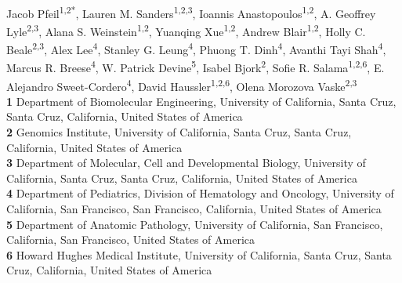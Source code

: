 \documentclass[10pt,letterpaper]{article}
\begin{document}
\vspace*{0.2in}

\begin{flushleft}
{\Large
\textbf{} %
}
\newline
\\
Jacob Pfeil\textsuperscript{1,2*},
Lauren M. Sanders\textsuperscript{1,2,3},
Ioannis Anastopoulos\textsuperscript{1,2},
A. Geoffrey Lyle\textsuperscript{2,3},
Alana S. Weinstein\textsuperscript{1,2},
Yuanqing Xue\textsuperscript{1,2},
Andrew Blair\textsuperscript{1,2},
Holly C. Beale\textsuperscript{2,3},
Alex Lee\textsuperscript{4},
Stanley G. Leung\textsuperscript{4},
Phuong T. Dinh\textsuperscript{4},
Avanthi Tayi Shah\textsuperscript{4},
Marcus R. Breese\textsuperscript{4},
W. Patrick Devine\textsuperscript{5},
Isabel Bjork\textsuperscript{2},
Sofie R. Salama\textsuperscript{1,2,6\ddag},
E. Alejandro Sweet-Cordero\textsuperscript{4\ddag},
David Haussler\textsuperscript{1,2,6\ddag},
Olena Morozova Vaske\textsuperscript{2,3\ddag}
\\
\bigskip
\textbf{1} Department of Biomolecular Engineering, University of California, Santa Cruz, Santa Cruz, California, United States of America
\\
\textbf{2} Genomics Institute, University of California, Santa Cruz, Santa Cruz, California, United States of America
\\
\textbf{3} Department of Molecular, Cell and Developmental Biology, University of California, Santa Cruz, Santa Cruz, California, United States of America
\\
\textbf{4} Department of Pediatrics, Division of Hematology and Oncology, University of California, San Francisco, San Francisco, California, United States of America
\\
\textbf{5} Department of Anatomic Pathology, University of California, San Francisco, California, San Francisco, United States of America
\\
\textbf{6} Howard Hughes Medical Institute, University of California, Santa Cruz, Santa Cruz, California, United States of America
\\
\bigskip


\end{flushleft}
\end{document}

